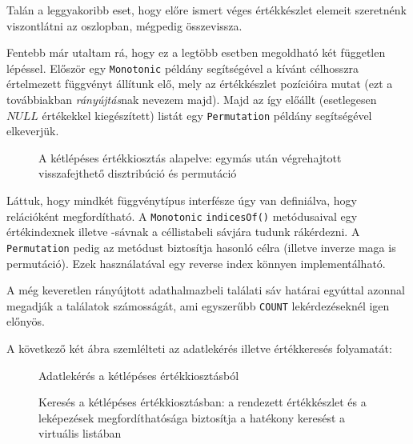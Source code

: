 \documentclass[
    parspace,
    noindent,
    nohyp,
]{elteiktdk}[2023/04/10]
\begin{document}
Talán a leggyakoribb eset,
hogy előre ismert véges értékkészlet elemeit szeretnénk viszontlátni az oszlopban,
mégpedig összevissza.

Fentebb már utaltam rá, hogy ez a legtöbb esetben megoldható két független lépéssel.
Először egy \texttt{Monotonic} példány segítségével a kívánt célhosszra
értelmezett függvényt állítunk elő, mely az értékkészlet pozícióira mutat
(ezt a továbbiakban \textit{rányújtás}nak nevezem majd).
Majd az így előállt (esetlegesen $NULL$ értékekkel kiegészített) listát
egy \texttt{Permutation} példány segítségével elkeverjük.

\begin{figure}[H]
\centering

\caption[A kétlépéses értékkiosztás alapelve]{
    A kétlépéses értékkiosztás alapelve:
    egymás után végrehajtott visszafejthető disztribúció és permutáció
}
\end{figure}

Láttuk, hogy mindkét függvénytípus interfésze úgy van definiálva, hogy relációként megfordítható.
A \texttt{Monotonic} \texttt{indicesOf()} metódusaival egy értékindexnek illetve -sávnak
a céllistabeli sávjára tudunk rákérdezni.
A \texttt{Permutation} pedig az  metódust biztosítja hasonló célra
(illetve inverze maga is permutáció).
Ezek használatával egy reverse index könnyen implementálható.

A még keveretlen rányújtott adathalmazbeli találati sáv határai
egyúttal azonnal megadják a találatok számosságát,
ami egyszerűbb \texttt{COUNT} lekérdezéseknél igen előnyös.

A következő két ábra szemlélteti az adatlekérés illetve értékkeresés folyamatát:

\begin{figure}[H]
  \centering
  \begin{minipage}[t]{0.48\textwidth}
    
    \caption{Adatlekérés a kétlépéses értékkiosztásból}
  \end{minipage}
  \hspace*{\fill}
  \begin{minipage}[t]{0.48\textwidth}
    
    \caption[Keresés a kétlépéses értékkiosztásban]{
      Keresés a kétlépéses értékkiosztásban:
      a rendezett értékkészlet és a leképezések megfordíthatósága
      biztosítja a hatékony keresést a virtuális listában
    }
  \end{minipage}
\end{figure}
\end{document}

